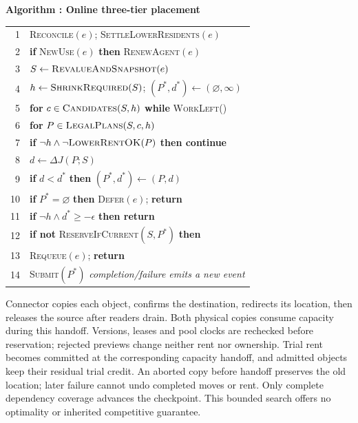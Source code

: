 \par\medskip\noindent\begin{minipage}{\columnwidth}
\raggedright
 \label{alg:placement}
 \textbf{Algorithm \thedesignalgorithm: Online three-tier placement}
 \par\smallskip
 \begin{tabularx}{\columnwidth}{@{}r@{\quad}X@{}}
 \toprule
 1 & \textsc{Reconcile}$(e)$; \textsc{SettleLowerResidents}$(e)$ \\
 2 & \textbf{if} \textsc{NewUse}$(e)$ \textbf{then} \textsc{RenewAgent}$(e)$ \\
 3 & $S\gets\textsc{RevalueAndSnapshot}(e)$ \\
 4 & $h\gets\textsc{ShrinkRequired}(S)$; $(P^*,d^*)\gets(\varnothing,\infty)$ \\
 5 & \textbf{for} $c\in\textsc{Candidates}(S,h)$ \textbf{while} \textsc{WorkLeft}() \\
 6 & \quad \textbf{for} $P\in\textsc{LegalPlans}(S,c,h)$ \\
 7 & \qquad \textbf{if} $\neg h\land\neg\textsc{LowerRentOK}(P)$ \textbf{then continue} \\
 8 & \qquad $d\gets\Delta J(P;S)$ \\
 9 & \qquad \textbf{if} $d<d^*$ \textbf{then} $(P^*,d^*)\gets(P,d)$ \\
 10 & \textbf{if} $P^*=\varnothing$ \textbf{then} \textsc{Defer}$(e)$; \textbf{return} \\
 11 & \textbf{if} $\neg h\land d^*\ge-\epsilon$ \textbf{then return} \\
 12 & \textbf{if not} \textsc{ReserveIfCurrent}$(S,P^*)$ \textbf{then} \\
 13 & \quad \textsc{Requeue}$(e)$; \textbf{return} \\
 14 & \textsc{Submit}$(P^*)$ \quad\textit{completion/failure emits a new event} \\
 \bottomrule
 \end{tabularx}
\end{minipage}\par\medskip

Connector copies each object, confirms the destination, redirects its
location, then releases the source after readers drain. Both physical
copies consume capacity during this handoff. Versions, leases and pool
clocks are rechecked before reservation; rejected previews change neither
rent nor ownership. Trial rent becomes committed at the corresponding
capacity handoff, and admitted objects keep their residual trial credit.
An aborted copy before handoff preserves the old location; later failure
cannot undo completed moves or rent. Only complete dependency coverage advances the
checkpoint. This bounded search offers no optimality or inherited
competitive guarantee.

